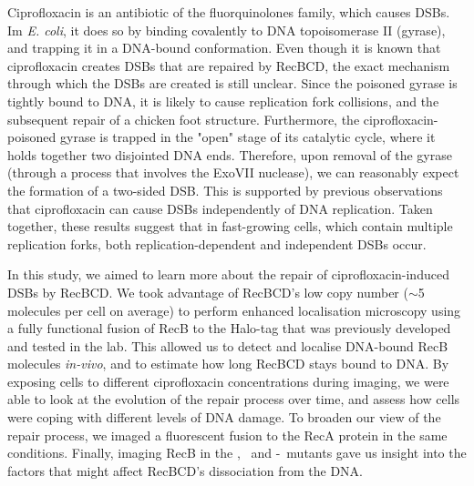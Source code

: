 Ciprofloxacin is an antibiotic of the fluor\-quinolones family, which causes DSBs. Im \emph{E. coli}, it does so by binding covalently to DNA topoisomerase II (gyrase), and trapping it in a DNA-bound conformation\cite{Kohanski2010}. Even though it is known that ciprofloxacin creates DSBs that are repaired by RecBCD, the exact mechanism through which the DSBs are created is still unclear. Since the poisoned gyrase is tightly bound to DNA, it is likely to cause replication fork collisions\cite{Wentzell2000, Drlica2008}, and the subsequent repair of a chicken foot structure. Furthermore, the ciprofloxacin-poisoned gyrase is trapped in the "open" stage of its catalytic cycle, where it holds together two disjointed DNA ends. Therefore, upon removal of the gyrase (through a process that involves the ExoVII nuclease\cite{Huang2021}), we can reasonably expect the formation of a two-sided DSB. This is supported by previous observations that ciprofloxacin can cause DSBs independently of DNA replication\cite{Zhao2006}. Taken together, these results suggest that in fast-growing cells, which contain multiple replication forks, both replication-dependent and independent DSBs occur.

In this study, we aimed to learn more about the repair of ciprofloxacin-induced DSBs by RecBCD. We took advantage of RecBCD's low copy number ($\sim$5 molecules per cell on average\cite{Lepore2019a}) to perform enhanced localisation microscopy\cite{Yu2006, Elf2007} using a fully functional fusion of RecB to the Halo-tag that was previously developed and tested in the lab\cite{Lepore2019a}. This allowed us to detect and localise DNA-bound RecB molecules \emph{in-vivo}, and to estimate how long RecBCD stays bound to DNA. By exposing cells to different ciprofloxacin concentrations during imaging, we were able to look at the evolution of the repair process over time, and assess how cells were coping with different levels of DNA damage. To broaden our view of the repair process, we imaged a fluorescent fusion to the RecA protein in the same conditions. Finally, imaging RecB in the \dreca, \teneighty\ and \dreca-\teneighty\ mutants gave us insight into the factors that might affect RecBCD's dissociation from the DNA.
